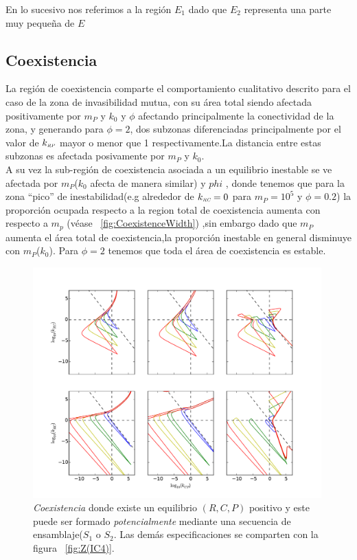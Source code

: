 En lo sucesivo nos referimos a la regi\'on $E_1$ dado que $E_2$ representa una parte muy peque\~na de $E$

\subsection{Coexistencia}

La regi\'on de coexistencia comparte el comportamiento cualitativo descrito para el caso de la zona de invasibilidad mutua, con su \'area total siendo afectada positivamente por $m_P$ y $k_0$ y $\phi$ afectando principalmente la conectividad de la zona, y generando para $\phi = 2$, dos subzonas diferenciadas principalmente por el valor de $k_{\textit{\tiny RP}}$ mayor o menor que 1 respectivamente.La distancia entre estas subzonas es afectada posivamente por $m_P$ y $k_0$. \\

A su vez la sub-regi\'on de coexistencia asociada a un equilibrio inestable se ve afectada por $m_P$($k_0$ afecta de manera similar) y $phi$ , donde tenemos que para la zona ``pico'' de inestabilidad(e.g alrededor de $k_{\textit{\tiny RC}} = 0$ para $m_P = 10^5$ y $\phi = 0.2$) la proporci\'on ocupada respecto a la region total de coexistencia aumenta con respecto a $m_p$ (v\'ease ~\ref{fig:CoexistenceWidth}) ,sin embargo dado que $m_P$ aumenta el \'area total de coexistencia,la proporci\'on inestable en general disminuye con $m_P$($k_0$). Para $\phi = 2$ tenemos que toda el \'area de coexistencia es estable.

\begin{figure}
  \centering
  \includegraphics[width = 0.99\textwidth]{./Plots/CoexistenceAcGrGr.pdf}
  \caption[Env $Coexistencia$]{\emph{Coexistencia} donde existe un equilibrio $(R,C,P)$ positivo y este puede ser formado \emph{potencialmente} mediante una secuencia de ensamblaje($S_1$ o $S_2$. Las dem\'as especificaciones se comparten con la figura ~\ref{fig:Z(IC4)}.}
  \label{fig:PSCoexistence}
\end{figure}



